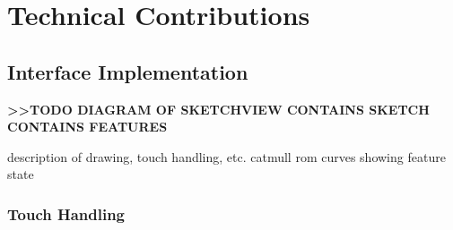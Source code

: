 \chapter{Technical Contributions}

\section{Interface Implementation}\label{interface-implementation}

\textbf{\textgreater{}\textgreater{}TODO DIAGRAM OF SKETCHVIEW CONTAINS
SKETCH CONTAINS FEATURES}

description of drawing, touch handling, etc. catmull rom curves showing
feature state

\subsection{Touch Handling}\label{touch-handling}
